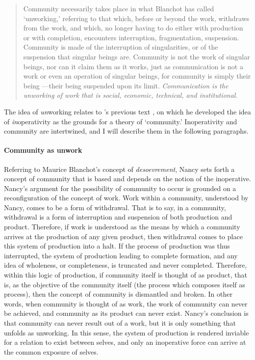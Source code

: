 \begin{quote}
	Community necessarily takes place in what Blanchot has called `unworking,' referring to that which, before or beyond the work, withdraws from the work, and which, no longer having to do either with production or with completion, encounters interruption, fragmentation, suspension. Community is made of the interruption of singularities, or of the suspension that singular beings are. Community is not the work of singular beings, nor can it claim them as it works, just as communication is not a work or even an operation of singular beings, for community is simply their being ---their being suspended upon its limit. \textit{Communication is the unworking of work that is social, economic, technical, and institutional}. \im \parencite[31]{Nan91:The} 
\end{quote} %

% 
% 
% 
% 
% 


The idea of \textit{un}working relates to \citeauthor{Nan91:The}'s previous text  \parencite{Nan91:The}, on which he developed the idea of \textit{in}operativity as the grounds for a theory of `community.' Inoperativity and community are intertwined, and I will describe them in the following paragraphs. 


\paragraph{Community as unwork}
Referring to Maurice Blanchot's concept of \textit{desoevrement}, Nancy sets forth a concept of community that is based and depends on the notion of the inoperative. Nancy's argument for the possibility of community to occur is grounded on a reconfiguration of the concept of work. Work within a community, understood by Nancy, comes to be a form of withdrawal. That is to say, in a community, withdrawal is a form of interruption and suspension of both production and product. Therefore, if work is understood as the means by which a community arrives at the production of any given product, then withdrawal comes to place this system of production into a halt. If the process of production was thus interrupted, the system of production leading to complete formation, and any idea of wholeness, or completeness, is truncated and never completed. Therefore, within this logic of production, if community itself is thought of as product, that is, as the objective of the community itself (the process which composes itself as process), then the concept of community is dismantled and broken. In other words, when community is thought of as work, the work of community can never be achieved, and community as its product can never exist. Nancy's conclusion is that community can never result out of a work, but it is only something that unfolds as unworking. In this sense, the system of production is rendered inviable for a relation to exist between selves, and only an inoperative force can arrive at the common exposure of selves.

